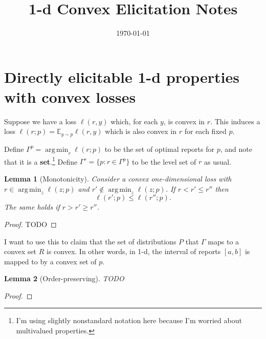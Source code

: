 \documentclass[12pt]{article}
\title{1-d Convex Elicitation Notes}
\date{\today}
\newcommand{\E}{\mathbb{E}}
\DeclareMathOperator*{\argmin}{arg\,min}
\newtheorem{lemma}{Lemma}
\theoremstyle{definition}
\begin{document}
\maketitle

\section{Directly elicitable 1-d properties with convex losses}

Suppose we have a loss $\ell(r,y)$ which, for each $y$, is convex in $r$.
This induces a loss $\ell(r;p) = \E_{y\sim p} \ell(r,y)$ which is also convex in $r$ for each fixed $p$.

Define $\Gamma^p = \argmin_r \ell(r;p)$ to be the set of optimal reports for $p$, and note that it is a \textbf{set}.\footnote{I'm using slightly nonstandard notation here because I'm worried about multivalued properties.}
Define $\Gamma^r = \{p : r \in \Gamma^p\}$ to be the level set of $r$ as usual.

\begin{lemma}[Monotonicity] \label{lemma:monot}
  Consider a convex one-dimensional loss with $r \in \argmin_{z} \ell(z;p)$ and $r' \not\in \argmin_z \ell(z;p)$.
  If $r < r' \leq r''$ then
    \[ \ell(r';p) \leq \ell(r'';p) . \]
  The same holds if $r > r' \geq r''$.
\end{lemma}
\begin{proof}
  TODO
\end{proof}

I want to use this to claim that the set of distributions $P$ that $\Gamma$ maps to a convex set $R$ is convex.
In other words, in 1-d, the interval of reports $[a,b]$ is mapped to by a convex set of $p$.

\begin{lemma}[Order-preserving]
  TODO
\end{lemma}
\begin{proof}
%
\end{proof}
\end{document}

